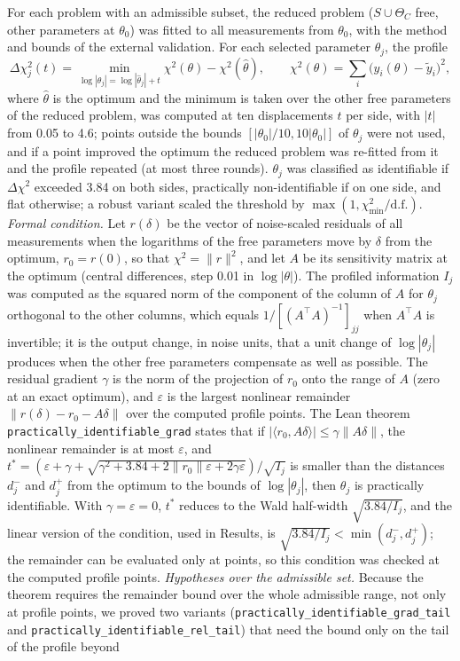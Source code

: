 \documentclass[pdflatex,sn-nature]{sn-jnl}
\theoremstyle{plain}
\begin{document}
For each problem with an admissible subset, the reduced problem ($S\cup\Theta_C$ free, other parameters at $\theta_0$) was fitted to all measurements from $\theta_0$, with the method and bounds of the external validation. For each selected parameter $\theta_j$, the profile
\begin{equation}
\Delta\chi^2_j(t)=\min_{\log|\theta_j|=\log|\hat\theta_j|+t}\chi^2(\theta)-\chi^2(\hat\theta),\qquad \chi^2(\theta)=\sum_i\big(y_i(\theta)-\tilde y_i\big)^2,
\label{eq:profile}
\end{equation}
where $\hat\theta$ is the optimum and the minimum is taken over the other free parameters of the reduced problem, was computed at ten displacements $t$ per side, with $|t|$ from 0.05 to 4.6; points outside the bounds $[|\theta_0|/10,10|\theta_0|]$ of $\theta_j$ were not used, and if a point improved the optimum the reduced problem was re-fitted from it and the profile repeated (at most three rounds). $\theta_j$ was classified as identifiable if $\Delta\chi^2$ exceeded 3.84 on both sides, practically non-identifiable if on one side, and flat otherwise\cite{bib24}; a robust variant scaled the threshold by $\max(1,\chi^2_{\min}/\mathrm{d.f.})$. \label{met:identif-theorem}\emph{Formal condition.} Let $r(\delta)$ be the vector of noise-scaled residuals of all measurements when the logarithms of the free parameters move by $\delta$ from the optimum, $r_0=r(0)$, so that $\chi^2=\|r\|^2$, and let $A$ be its sensitivity matrix at the optimum (central differences, step 0.01 in $\log|\theta|$). The profiled information $I_j$ was computed as the squared norm of the component of the column of $A$ for $\theta_j$ orthogonal to the other columns, which equals $1/[(A^{\top}A)^{-1}]_{jj}$ when $A^{\top}A$ is invertible; it is the output change, in noise units, that a unit change of $\log|\theta_j|$ produces when the other free parameters compensate as well as possible. The residual gradient $\gamma$ is the norm of the projection of $r_0$ onto the range of $A$ (zero at an exact optimum), and $\varepsilon$ is the largest nonlinear remainder $\|r(\delta)-r_0-A\delta\|$ over the computed profile points. The Lean theorem \texttt{practically\_identifiable\_grad} states that if $|\langle r_0,A\delta\rangle|\le\gamma\|A\delta\|$, the nonlinear remainder is at most $\varepsilon$, and $t^{\ast}=(\varepsilon+\gamma+\sqrt{\gamma^2+3.84+2\|r_0\|\varepsilon+2\gamma\varepsilon})/\sqrt{I_j}$ is smaller than the distances $d_j^-$ and $d_j^+$ from the optimum to the bounds of $\log|\theta_j|$, then $\theta_j$ is practically identifiable. With $\gamma=\varepsilon=0$, $t^\ast$ reduces to the Wald half-width $\sqrt{3.84/I_j}$, and the linear version of the condition, used in Results, is $\sqrt{3.84/I_j}<\min(d_j^-,d_j^+)$; the remainder can be evaluated only at points, so this condition was checked at the computed profile points. \label{met:identif-region}\emph{Hypotheses over the admissible set.} Because the theorem requires the remainder bound over the whole admissible range, not only at profile points, we proved two variants (\texttt{practically\_identifiable\_grad\_tail} and \texttt{practically\_identifiable\_rel\_tail}) that need the bound only on the tail of the profile beyond 
\end{document}
